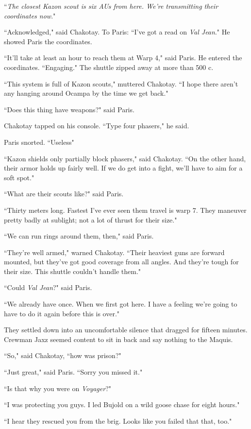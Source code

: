 \documentclass[twoside,letterpaper,12pt]{memoir}
\begin{document}
``\textit{The closest Kazon scout is six AUs from here. We're transmitting their coordinates now}."

``Acknowledged," said Chakotay. To Paris: ``I've got a read on \textit{Val Jean}." He showed Paris the coordinates.

``It'll take at least an hour to reach them at Warp 4," said Paris. He entered the coordinates. ``Engaging." The shuttle zipped away at more than 500 c.

``This system is full of Kazon scouts," muttered Chakotay. ``I hope there aren't any hanging around Ocampa by the time we get back."

``Does this thing have weapons?" said Paris.

Chakotay tapped on his console. ``Type four phasers," he said.

Paris snorted. ``Useless"

``Kazon shields only partially block phasers," said Chakotay. ``On the other hand, their armor holds up fairly well. If we do get into a fight, we'll have to aim for a soft spot."

``What are their scouts like?" said Paris.

``Thirty meters long. Fastest I've ever seen them travel is warp 7. They maneuver pretty badly at sublight; not a lot of thrust for their size."

``We can run rings around them, then," said Paris.

``They're well armed," warned Chakotay. ``Their heaviest guns are forward mounted, but they've got good coverage from all angles. And they're tough for their size. This shuttle couldn't handle them."

``Could \textit{Val Jean}?" said Paris.

``We already have once. When we first got here. I have a feeling we're going to have to do it again before this is over."

They settled down into an uncomfortable silence that dragged for fifteen minutes. Crewman Jaxz seemed content to sit in back and say nothing to the Maquis.

``So," said Chakotay, ``how was prison?"

``Just great," said Paris. ``Sorry you missed it."

``Is that why you were on \textit{Voyager}?"

``I was protecting you guys. I led Bujold on a wild goose chase for eight hours."

``I hear they rescued you from the brig. Looks like you failed that that, too."
\end{document}
